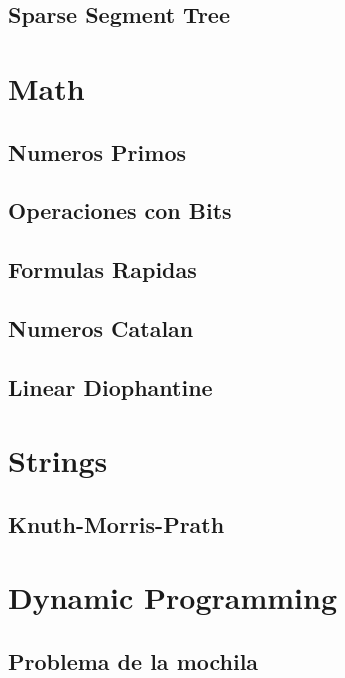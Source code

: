 \subsection{Sparse Segment Tree}
\raggedbottom
\hrulefill
\newpage

\section{Math}
\subsection{Numeros Primos}
\raggedbottom
\hrulefill
\subsection{Operaciones con Bits}
\raggedbottom
\hrulefill
\subsection{Formulas Rapidas}
\raggedbottom
\hrulefill
\subsection{Numeros Catalan}
\raggedbottom
\hrulefill
\subsection{Linear Diophantine}
\raggedbottom
\hrulefill
\newpage

\section{Strings}
\subsection{Knuth-Morris-Prath}
\raggedbottom
\hrulefill
\newpage

\section{Dynamic Programming}
\subsection{Problema de la mochila}
\raggedbottom
\hrulefill

